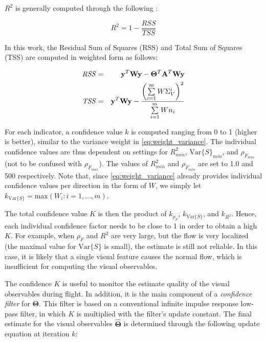 $R^2$ is generally computed through the following \cite{Weisberg2005}:

\begin{equation}
\label{eq:R2}
{R^2} = 1 - \frac{\mathit{RSS}}{\mathit{TSS}}
\end{equation}

In this work, the Residual Sum of Squares (RSS) and Total Sum of Squares (TSS) are computed in weighted form as follows:

\begin{equation}
\begin{aligned}
\mathit{RSS} &=& {{\bf{y}}^T}{\bf{Wy}} - {{\bf{\Theta }}^T}{{\bf{A}}^T}{\bf{Wy}}\\
\mathit{TSS} &=& {{\bf{y}}^T}{\bf{Wy}} - \frac{\left({\sum\limits_{i = 1}^m {W\Sigma _V^i} }\right)^2}{{\sum\limits_{i = 1}^m {W{n_i}} }}
\end{aligned}
\end{equation}

For each indicator, a confidence value $k$ is computed ranging from 0 to 1 (higher is better), similar to the variance weight in \cref{eq:weight_variance}. The individual confidence values are thus dependent on settings for $R^2_{min}$, $\mathrm{Var}\lbrace S\rbrace_{min}$, and $\rho_{F_{min}}$ (not to be confused with $\rho_{F_{max}}$). The values of $R^2_{min}$ and $\rho_{F_{min}}$ are set to 1.0 and 500 respectively. Note that, since \cref{eq:weight_variance} already provides individual confidence values per direction in the form of $W$, we simply let $k_{\mathrm{Var}\lbrace S\rbrace}=\mathrm{max}\left({W_i:i=1,\ldots,m}\right)$.

The total confidence value $K$ is then the product of $k_{\rho_F}$, $k_{\mathrm{Var}\lbrace S\rbrace}$, and $k_{R^2}$. Hence, each individual confidence factor needs to be close to 1 in order to obtain a high $K$. For example, when $\rho_F$ and $R^2$ are very large, but the flow is very localized (the maximal value for $\mathrm{Var}\lbrace S\rbrace$ is small), the estimate is still not reliable. In this case, it is likely that a single visual feature causes the normal flow, which is insufficient for computing the visual observables.

The confidence $K$ is useful to monitor the estimate quality of the visual observables during flight. In addition, it is the main component of a \emph{confidence filter} for $\mathbf{\Theta}$. This filter is based on a conventional infinite impulse response low-pass filter, in which $K$ is multiplied with the filter's update constant. The final estimate for the visual observables $\hat{\mathbf{\Theta}}$ is determined through the following update equation at iteration $k$:

